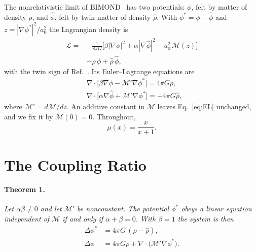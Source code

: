 \documentclass[twocolumn]{iopjournal}
\begin{document}
The nonrelativistic limit of BIMOND~\cite{Milgrom2009,Milgrom2010twin}
has two potentials: $\phi$, felt by matter of density $\rho$, and
$\hat\phi$, felt by twin matter of density $\hat\rho$. With
$\phi^* = \phi - \hat\phi$ and $z = |\nabla\phi^*|^2/a_0^2$ the
Lagrangian density is
\begin{equation}
\begin{aligned}
  \mathcal{L} = &-\frac{1}{8\pi G}\Big[\beta|\nabla\phi|^2
     + \alpha|\nabla\hat\phi|^2 - a_0^2\,\mathcal{M}(z)\Big] \\
     &- \rho\,\phi + \hat\rho\,\hat\phi ,
\end{aligned}
  \label{eq:L}
\end{equation}
with the twin sign of Ref.~\cite{Milgrom2010twin}. Its
Euler--Lagrange equations are
\begin{equation}
\begin{aligned}
  &\nabla\cdot\big[\beta\nabla\phi - \mathcal{M}'\nabla\phi^*\big]
    = 4\pi G\rho, \\
  &\nabla\cdot\big[\alpha\nabla\hat\phi + \mathcal{M}'\nabla\phi^*\big]
    = -4\pi G\hat\rho ,
\end{aligned}
  \label{eq:EL}
\end{equation}
where $\mathcal{M}' = d\mathcal{M}/dz$. An additive constant in
$\mathcal{M}$ leaves Eq.~\eqref{eq:EL} unchanged, and we fix it by
$\mathcal{M}(0) = 0$. Throughout,
\begin{equation}
  \mu(x) = \frac{x}{x+1}.
  \label{eq:mu}
\end{equation}


\section*{The Coupling Ratio}

\paragraph{Theorem 1.} \textit{Let $\alpha\beta \neq 0$ and let
$\mathcal{M}'$ be nonconstant. The potential $\phi^*$ obeys a linear
equation independent of $\mathcal{M}$ if and only if
$\alpha + \beta = 0$. With $\beta = 1$ the system is then}
\begin{equation}
\begin{aligned}
  \Delta\phi^* &= 4\pi G\,(\rho - \hat\rho), \\
  \Delta\phi &= 4\pi G\rho + \nabla\cdot\big(\mathcal{M}'\nabla\phi^*\big).
\end{aligned}
  \label{eq:qumond}
\end{equation}
\end{document}

